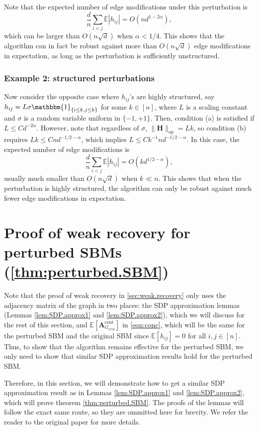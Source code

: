\documentclass[11pt, titlepage]{article} %
\numberwithin{equation}{section}
\theoremstyle{definition}
\numberwithin{theorem}{section}
\numberwithin{lemma}{section}
\numberwithin{corollary}{section}
\numberwithin{proposition}{section}
\numberwithin{definition}{section}
\numberwithin{remark}{section}
\begin{document}
Note that the expected number of edge modifications under this perturbation is
\[\frac{d}{n}\sum_{i < j} \mathbb{E}|h_{ij}| = O\left(nd^{1 - 2\alpha}\right),\]
which can be larger than $O(n\sqrt{d})$ when $\alpha < 1/4$. This shows that the algorithm can in fact
be robust against more than $O(n\sqrt{d})$ edge modifications in expectation, as long as the
perturbation is sufficiently unstructured.

\subsubsection{Example 2: structured perturbations}
Now consider the opposite case where $h_{ij}$'s are highly structured, say 
$h_{ij} = L\sigma \mathbbm{1}_{\{i\leq k, j\leq k\}}$ for some $k \in [n]$, where $L$ is a scaling
constant and $\sigma$ is a random variable uniform in $\{-1, +1\}$. Then, condition (a) is satisfied
if $L \leq Cd^{-2\alpha}$. However, note that regardless of $\sigma$, $\|\bm{H}\|_\text{op} = Lk$, 
so condition (b) requires $Lk \leq Cnd^{-1/2 - \alpha}$, which implies $L \leq C k^{-1} n d^{-1/2 - \alpha}$.
In this case, the expected number of edge modifications is
\[\frac{d}{n}\sum_{i < j} \mathbb{E}|h_{ij}| = O\left(kd^{1/2 - \alpha}\right),\]
usually much smaller than $O(n\sqrt{d})$ when $k \ll n$. This shows that when the perturbation is highly
structured, the algorithm can only be robust against much fewer edge modifications in expectation.

\section{Proof of weak recovery for perturbed SBMs (\cref{thm:perturbed.SBM})}
\label{sec:sdp.approx}
Note that the proof of weak recovery in \cref{sec:weak.recovery} only uses the adjacency matrix of the graph 
in two places: the SDP approximation lemmas (Lemmas \ref{lem:SDP.approx1} and \ref{lem:SDP.approx2}),
which we will discuss for the rest of this section,
and $\mathbb{E}[\bm{A}_{G_\mathrm{eval}}^\mathrm{cent}]$ in \cref{eqn:conc}, which will be the same
for the perturbed SBM and the original SBM since $\mathbb{E}[h_{ij}] = 0$ for all $i, j \in [n]$.
Thus, to show that the algorithm remains effective for the perturbed SBM,
we only need to show that similar SDP approximation results hold for the perturbed SBM.

Therefore, in this section, we will demonstrate how to get a similar SDP approximation 
result as in Lemmas \ref{lem:SDP.approx1} and \ref{lem:SDP.approx2}, which will prove theorem 
\ref{thm:perturbed.SBM}. The proofs of the lemmas will follow the exact same route, so they are
ommitted here for brevity. We refer the reader to the original paper \cite{MS16} for more details.
\end{document}
